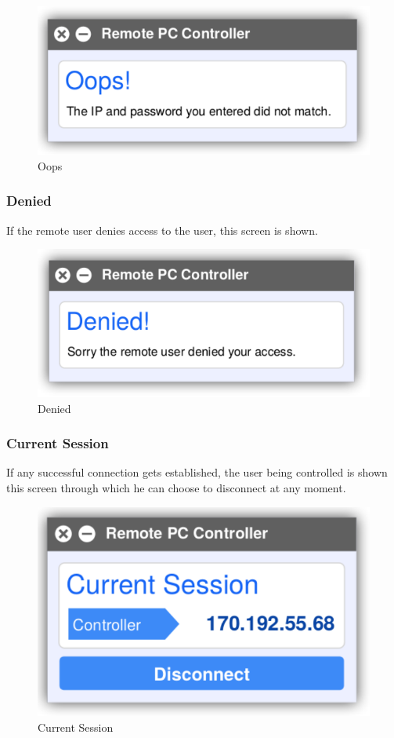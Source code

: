 \documentclass[12pt, a4paper]{article}
\begin{document}
\begin{figure}[h!]
\centering
\includegraphics[scale=0.75]{oops}
\caption{Oops}
\end{figure}

\subsubsection{Denied}
If the remote user denies access to the user, this screen is shown.

\begin{figure}[h!]
\centering
\includegraphics[scale=0.75]{denied}
\caption{Denied}
\end{figure}

\newpage

\subsubsection{Current Session}
If any successful connection gets established, the user being controlled is shown this screen through which he can choose to disconnect at any moment.

\begin{figure}[h!]
\centering
\includegraphics[scale=0.75]{current}
\caption{Current Session}
\end{figure}
\end{document}
